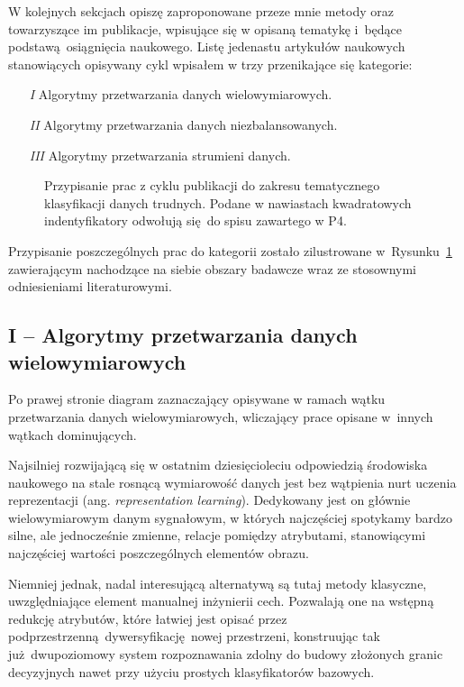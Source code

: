 W kolejnych sekcjach opiszę zaproponowane przeze mnie metody oraz towarzyszące im publikacje, wpisujące się w opisaną tematykę i~będące podstawą osiągnięcia naukowego. Listę jedenastu artykułów naukowych stanowiących opisywany cykl wpisałem w trzy przenikające się kategorie:

\begin{enumerate}
	\item[\emph{I}] Algorytmy przetwarzania danych wielowymiarowych.
	\item[\emph{II}] Algorytmy przetwarzania danych niezbalansowanych.
	\item[\emph{III}] Algorytmy przetwarzania strumieni danych.
\end{enumerate}

\begin{figure}[h]
	\centering
	\scalebox{.6}{}
	\caption{Przypisanie prac z cyklu publikacji do zakresu tematycznego klasyfikacji danych trudnych. Podane w nawiastach kwadratowych indentyfikatory odwołują się do spisu zawartego w P4.}\label{fig:philips}
\end{figure}

Przypisanie poszczególnych prac do kategorii zostało zilustrowane w~Rysunku~\ref{fig:philips} zawierającym nachodzące na siebie obszary badawcze wraz ze stosownymi odniesieniami literaturowymi.

\subsection*{I -- Algorytmy przetwarzania danych wielowymiarowych}

\marginnote{\scalebox{.6}{}}

Po prawej stronie diagram zaznaczający opisywane w ramach wątku przetwarzania danych wielowymiarowych, wliczający prace opisane w~innych wątkach dominujących.

Najsilniej rozwijającą się w ostatnim dziesięcioleciu odpowiedzią środowiska naukowego na stale rosnącą wymiarowość danych jest bez wątpienia nurt uczenia reprezentacji (ang. \emph{representation learning}). Dedykowany jest on głównie wielowymiarowym danym sygnałowym, w których najczęściej spotykamy bardzo silne, ale jednocześnie zmienne, relacje pomiędzy atrybutami, stanowiącymi najczęściej wartości poszczególnych elementów obrazu.

Niemniej jednak, nadal interesującą alternatywą są tutaj metody klasyczne, uwzględniające element manualnej inżynierii cech. Pozwalają one na wstępną redukcję atrybutów, które łatwiej jest opisać przez podprzestrzenną dywersyfikację nowej przestrzeni, konstruując tak już dwupoziomowy system rozpoznawania zdolny do budowy złożonych granic decyzyjnych nawet przy użyciu prostych klasyfikatorów bazowych.

